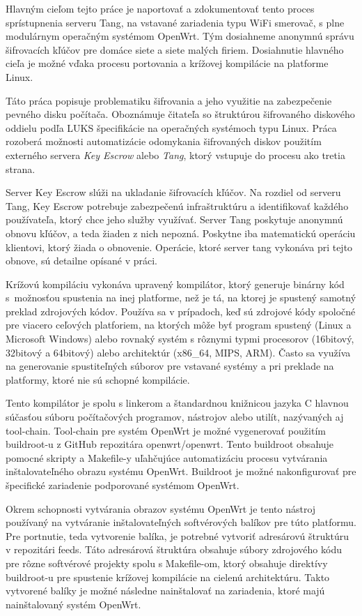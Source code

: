 Hlavným cieľom tejto práce je naportovať a zdokumentovať tento proces sprístupnenia serveru Tang, na vstavané zariadenia typu WiFi smerovač, s plne modulárnym operačným systémom OpenWrt.
Tým dosiahneme anonymnú správu šifrovacích kľúčov pre domáce siete a siete malých firiem.
Dosiahnutie hlavného cieľa je možné vďaka procesu portovania a krížovej kompilácie na platforme Linux.

Táto práca popisuje problematiku šifrovania a jeho využitie na zabezpečenie pevného disku počítača.
Oboznámuje čitateľa so štruktúrou šifrovaného diskového oddielu podľa LUKS špecifikácie na operačných systémoch typu Linux.
Práca rozoberá možnosti automatizácie odomykania šifrovaných diskov použitím externého servera {\it Key Escrow} alebo {\it Tang}, ktorý vstupuje do procesu ako tretia strana.

Server Key Escrow slúži na ukladanie šifrovacích kľúčov.
Na rozdiel od serveru Tang, Key Escrow potrebuje zabezpečenú infraštruktúru a identifikovať každého používateľa, ktorý chce jeho služby využívať.
Server Tang poskytuje anonymnú obnovu kľúčov, a teda žiaden z nich nepozná. Poskytne iba matematickú operáciu klientovi, ktorý žiada o obnovenie.
Operácie, ktoré server tang vykonáva pri tejto obnove, sú detailne opísané v práci.

Krížovú kompiláciu vykonáva upravený kompilátor, ktorý generuje binárny kód s možnosťou spustenia na inej platforme, než je tá, na ktorej je spustený samotný preklad zdrojových kódov.
Používa sa v prípadoch, keď sú zdrojové kódy spoločné pre viacero ceľových platforiem, na ktorých môže byť program spustený (Linux a Microsoft Windows) alebo rovnaký systém s rôznymi typmi procesorov (16bitový, 32bitový a 64bitový) alebo architektúr (x86\_64, MIPS, ARM).
Často sa využíva na generovanie spustiteľných súborov pre vstavané systémy a pri preklade na platformy, ktoré nie sú schopné kompilácie.

Tento kompilátor je spolu s linkerom a štandardnou knižnicou jazyka C hlavnou súčasťou súboru počítačových programov, nástrojov alebo utilít, nazývaných aj tool-chain.
Tool-chain pre systém OpenWrt je možné vygenerovať použitím buildroot-u z GitHub repozitára openwrt/openwrt.
Tento buildroot obsahuje pomocné skripty a Makefile-y uľahčujúce automatizáciu procesu vytvárania inštalovateľného obrazu systému OpenWrt.
Buildroot je možné nakonfigurovať pre špecifické zariadenie podporované systémom OpenWrt.

Okrem schopnosti vytvárania obrazov systému OpenWrt je tento nástroj používaný na vytváranie inštalovateľných softvérových balíkov pre túto platformu.
Pre portnutie, teda vytvorenie balíka, je potrebné vytvoriť adresárovú štruktúru v repozitári feeds.
Táto adresárová štruktúra obsahuje súbory zdrojového kódu pre rôzne softvérové projekty spolu s Makefile-om, ktorý obsahuje direktívy buildroot-u pre spustenie krížovej kompilácie na cielenú architektúru.
Takto vytvorené balíky je možné následne nainštalovať na zariadenia, ktoré majú nainštalovaný systém OpenWrt.

